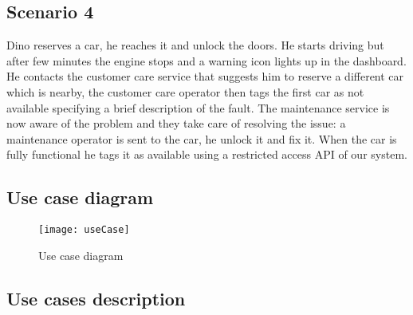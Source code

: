 \subsection{Scenario 4}
\label{scenario:4}
Dino reserves a car, he reaches it and unlock the doors. He starts driving but after few minutes the engine stops and a warning icon lights up in the dashboard. He contacts the customer care service that suggests him to reserve a different car which is nearby, the customer care operator then tags the first car as not available specifying a brief description of the fault. The maintenance service is now aware of the problem and they take care of resolving the issue: a maintenance operator is sent to the car, he unlock it  and fix it. When the car is fully functional he tags it as available using a restricted access API of our system.

\newpage\subsection{Use case diagram}
\begin{figure}[h]
			\centering
			\texttt{[image: useCase]}
			\caption{
				\label{fig:useCase} 
				Use case diagram
			}
		\end{figure}
\subsection{Use cases description}

